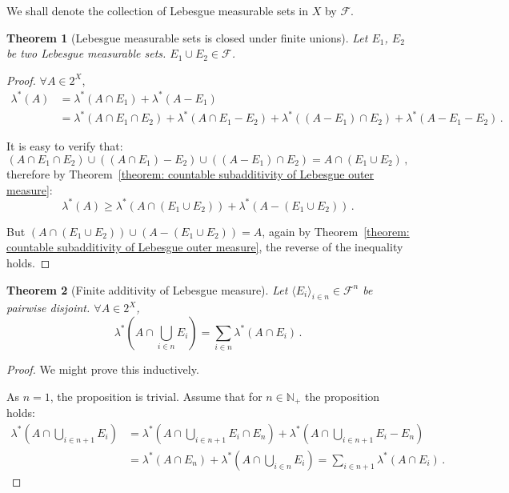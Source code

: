 \documentclass[openany]{book}
\theoremstyle{plain}
\newtheorem{theorem}{Theorem}[section] %
\theoremstyle{definition}
\begin{document}
We shall denote the collection of Lebesgue measurable sets in $X$ by $\mathscr F$.

\begin{theorem}[Lebesgue measurable sets is closed under finite unions]
	\label{theorem: Lebesgue measurable sets is closed under finite unions}
	Let $E_1$, $E_2$ be two Lebesgue measurable sets. 
	$E_1 \cup E_2 \in \mathscr F$.
\end{theorem}
\begin{proof}
	$\forall A \in 2^X$, 
	\begin{align*}
		\lambda^*(A) 
			&= \lambda^*(A \cap E_1) + \lambda^*(A - E_1)
		\\
			&= \lambda^*(A \cap E_1 \cap E_2) + \lambda^*(A \cap E_1 - E_2)
		+ \lambda^*((A - E_1) \cap E_2) + \lambda^*(A - E_1 - E_2)\,.
	\end{align*}

	It is easy to verify that:
	\begin{equation*}
		(A \cap E_1 \cap E_2) \cup ((A \cap E_1) - E_2) \cup ((A - E_1) \cap E_2)
		= A \cap (E_1 \cup E_2)\,,
	\end{equation*}
	therefore by Theorem~\ref{theorem: countable subadditivity of Lebesgue outer measure}:
	\begin{equation*}
		\lambda^*(A) \geq \lambda^*(A \cap (E_1 \cup E_2)) + \lambda^*(A - (E_1 \cup E_2))\,.
	\end{equation*}

	But $(A \cap (E_1 \cup E_2)) \cup (A - (E_1 \cup E_2)) = A$, again by Theorem~\ref{theorem: countable subadditivity of Lebesgue outer measure}, the reverse of the inequality holds.
\end{proof}

\begin{theorem}[Finite additivity of Lebesgue measure]
	\label{theorem: finite additivity of Lebesgue measure}
	Let $\langle E_i \rangle_{i \in n} \in \mathscr F^n$ be pairwise disjoint.
	$\forall A \in 2^X$, 
	\begin{equation*}
		\lambda^*\left(A \cap \bigcup_{i \in n} E_i \right)
		= \sum_{i \in n} \lambda^* (A \cap E_i)\,.
	\end{equation*}
\end{theorem}
\begin{proof}
	We might prove this inductively.

	As $n = 1$, the proposition is trivial. Assume that for $n \in \mathbb N_+$ the proposition holds:
	\begin{align*}
		\lambda^*\left( A \cap \bigcup_{i \in n + 1} E_i \right)
		&= \lambda^*\left( A \cap \bigcup_{i \in n + 1} E_i \cap E_n \right)
		+  \lambda^*\left( A \cap \bigcup_{i \in n + 1} E_i - E_n \right)
		\\
		&= \lambda^*( A \cap E_n ) + \lambda^*\left( A \cap \bigcup_{i \in n} E_i \right)
		= \sum_{i \in n + 1} \lambda^*(A \cap E_i)\,.
	\end{align*}
\end{proof}
\end{document}
